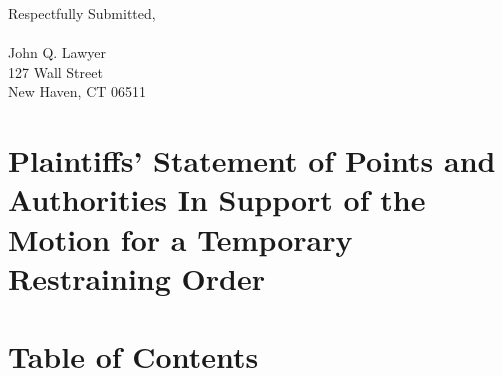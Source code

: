 \documentclass[12pt,\documentclassflag]{complaint}
\begin{document}
\begin{rightbox}
Respectfully Submitted,\\
~\\
John Q. Lawyer\\
127 Wall Street\\
New Haven, CT 06511\\
\end{rightbox}
\newpage

%
%
%
%
\makecaption

\section*{Plaintiffs' Statement of Points and Authorities In Support of the \\Motion for a Temporary Restraining Order}
\pagestyle{romanparen}
\thispagestyle{empty}
\newpage

\section*{Table of Contents}
\singlespacing
\tableofcontents \newpage

\begingroup
\tableofauthorities \newpage
\endgroup

\pagestyle{plain}
\end{document}
